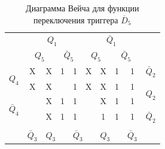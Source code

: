 \documentclass[a4paper,14pt]{article}
\begin{document}
\begin{table}[H]
	\begin{center}
		\caption{\label{tab:unD5_tab} Диаграмма Вейча для функции переключения триггера $\overline{D}_5$ }
\begin{tabular}{cccccccccc}
	                                                  &                                         \multicolumn{4}{c}{$Q_1$}                                          &                                      \multicolumn{4}{c}{$\bar{Q}_1$}                                       &                        \\
	                                                  &                \multicolumn{2}{c}{$Q_5$}                 &         \multicolumn{2}{c}{$\bar{Q}_5$}         &            \multicolumn{2}{c}{$Q_5$}            &             \multicolumn{2}{c}{$\bar{Q}_5$}              &                        \\ \cline{2-9}
	   \multicolumn{1}{c|}{\multirow{2}{*}{$Q_4$}}    &     \multicolumn{1}{c|}{X}      & \multicolumn{1}{c|}{X} & \multicolumn{1}{c|}{1} & \multicolumn{1}{c|}{1} & \multicolumn{1}{c|}{X} & \multicolumn{1}{c|}{X} & \multicolumn{1}{c|}{1} &     \multicolumn{1}{c|}{1}      &      $\bar{Q}_2$       \\ \cline{2-9}
	              \multicolumn{1}{c|}{}               &     \multicolumn{1}{c|}{X}      & \multicolumn{1}{c|}{X} & \multicolumn{1}{c|}{}  & \multicolumn{1}{c|}{1} & \multicolumn{1}{c|}{X} & \multicolumn{1}{c|}{X} & \multicolumn{1}{c|}{1} &     \multicolumn{1}{c|}{1}      & \multirow{2}{*}{$Q_2$} \\ \cline{2-9}
	\multicolumn{1}{c|}{\multirow{2}{*}{$\bar{Q}_4$}} &      \multicolumn{1}{c|}{}      & \multicolumn{1}{c|}{X} & \multicolumn{1}{c|}{1} & \multicolumn{1}{c|}{1} & \multicolumn{1}{c|}{}  & \multicolumn{1}{c|}{X} & \multicolumn{1}{c|}{1} &     \multicolumn{1}{c|}{1}      &                        \\ \cline{2-9}
	              \multicolumn{1}{c|}{}               &      \multicolumn{1}{c|}{}      & \multicolumn{1}{c|}{X} & \multicolumn{1}{c|}{1} & \multicolumn{1}{c|}{1} & \multicolumn{1}{c|}{}  & \multicolumn{1}{c|}{1} & \multicolumn{1}{c|}{1} &     \multicolumn{1}{c|}{1}      &      $\bar{Q}_2$       \\ \cline{2-9}
	                                                  &                                 &              \multicolumn{2}{c}{}               &              \multicolumn{2}{c}{}               &              \multicolumn{2}{c}{}               &                                 &                        \\
	              \multicolumn{1}{l}{}                & \multicolumn{1}{l}{$\bar{Q}_3$} & \multicolumn{2}{l}{$Q_3$}                       & \multicolumn{2}{l}{$\bar{Q}_3$}                 & \multicolumn{2}{l}{$Q_3$}                       & \multicolumn{1}{l}{$\bar{Q}_3$} &  \multicolumn{1}{l}{}
\end{tabular}
	\end{center}
\end{table}
\end{document}
